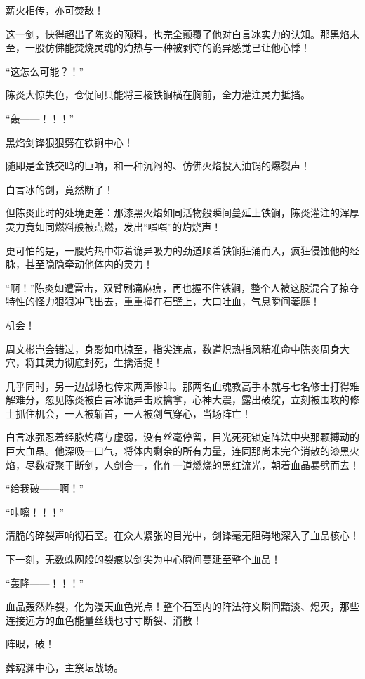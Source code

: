 薪火相传，亦可焚敌！

这一剑，快得超出了陈炎的预料，也完全颠覆了他对白言冰实力的认知。那黑焰未至，一股仿佛能焚烧灵魂的灼热与一种被剥夺的诡异感觉已让他心悸！

“这怎么可能？！”

陈炎大惊失色，仓促间只能将三棱铁锏横在胸前，全力灌注灵力抵挡。

“轰——！！！”

黑焰剑锋狠狠劈在铁锏中心！

随即是金铁交鸣的巨响，和一种沉闷的、仿佛火焰投入油锅的爆裂声！

白言冰的剑，竟然断了！

但陈炎此时的处境更差：那漆黑火焰如同活物般瞬间蔓延上铁锏，陈炎灌注的浑厚灵力竟如同燃料般被点燃，发出“嗤嗤”的灼烧声！

更可怕的是，一股灼热中带着诡异吸力的劲道顺着铁锏狂涌而入，疯狂侵蚀他的经脉，甚至隐隐牵动他体内的灵力！

“啊！”陈炎如遭雷击，双臂剧痛麻痹，再也握不住铁锏，整个人被这股混合了掠夺特性的怪力狠狠冲飞出去，重重撞在石壁上，大口吐血，气息瞬间萎靡！

机会！

周文彬岂会错过，身影如电掠至，指尖连点，数道炽热指风精准命中陈炎周身大穴，将其灵力彻底封死，生擒活捉！

几乎同时，另一边战场也传来两声惨叫。那两名血魂教高手本就与七名修士打得难解难分，忽见陈炎被白言冰诡异击败擒拿，心神大震，露出破绽，立刻被围攻的修士抓住机会，一人被斩首，一人被剑气穿心，当场阵亡！

白言冰强忍着经脉灼痛与虚弱，没有丝毫停留，目光死死锁定阵法中央那颗搏动的巨大血晶。他深吸一口气，将体内剩余的所有力量，连同那尚未完全消散的漆黑火焰，尽数凝聚于断剑，人剑合一，化作一道燃烧的黑红流光，朝着血晶暴劈而去！

“给我破——啊！”

“咔嚓！！！”

清脆的碎裂声响彻石室。在众人紧张的目光中，剑锋毫无阻碍地深入了血晶核心！

下一刻，无数蛛网般的裂痕以剑尖为中心瞬间蔓延至整个血晶！

“轰隆——！！！”

血晶轰然炸裂，化为漫天血色光点！整个石室内的阵法符文瞬间黯淡、熄灭，那些连接远方的血色能量丝线也寸寸断裂、消散！

阵眼，破！

\vspace{2em}

葬魂渊中心，主祭坛战场。

